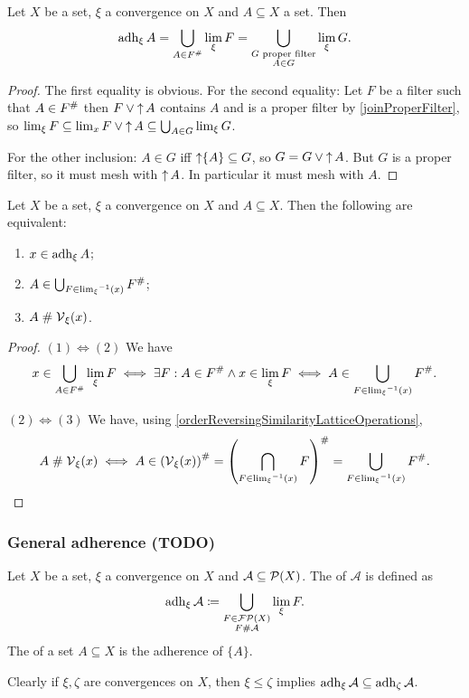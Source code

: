 \begin{lemma}
Let $X$ be a set, $\xi$ a convergence on $X$ and $A \subseteq X$ a set. Then
\[ \operatorname{adh}_\xi A = \bigcup_{A \in F^{\mathrel{\#}}}\lim_\xi F = \bigcup_{\substack{\text{$G$ proper filter} \\ A\in G}}\lim_\xi G. \]
\end{lemma}
\begin{proof}
The first equality is obvious. For the second equality: Let $F$ be a filter such that $A\in F^{\mathrel{\#}}$ then $F \vee \operatorname{\uparrow} A$ contains $A$ and is a proper filter by \ref{joinProperFilter}, so $\lim_\xi F \subseteq \lim_x F \vee \operatorname{\uparrow} A \subseteq \bigcup_{A\in G}\lim_\xi G$.

For the other inclusion: $A\in G$ iff $\operatorname{\uparrow}\{A\} \subseteq G$, so $G = G \vee \operatorname{\uparrow} A$. But $G$ is a proper filter, so it must mesh with $\operatorname{\uparrow} A$. In particular it must mesh with $A$.
\end{proof}



\begin{proposition}
Let $X$ be a set, $\xi$ a convergence on $X$ and $A \subseteq X$. Then the following are equivalent:
\begin{enumerate}
\item $x\in \operatorname{adh}_\xi A$;
\item $A\in \bigcup_{F\in {\lim_\xi}^{-1}(x)} F^{\mathrel{\#}}$;
\item $A \mathrel{\#} \operatorname{\mathcal{V}}_\xi(x)$.
\end{enumerate}
\end{proposition}
\begin{proof}
$(1) \Leftrightarrow (2)$ We have
\[ x\in \bigcup_{A\in F^{\mathrel{\#}}}\lim_\xi F \iff \exists F: A \in F^{\mathrel{\#}} \land x\in \lim_\xi F \iff A\in  \bigcup_{F\in {\lim_\xi}^{-1}(x)} F^{\mathrel{\#}}. \]

$(2) \Leftrightarrow (3)$ We have, using \ref{orderReversingSimilarityLatticeOperations},
\[ A \mathrel{\#} \operatorname{\mathcal{V}}_\xi(x) \iff A\in \left(\operatorname{\mathcal{V}}_\xi(x)\right)^{\mathrel{\#}} = \left(\bigcap_{F\in {\lim_\xi}^{-1}(x)}F\right)^{\mathrel{\#}} = \bigcup_{F\in {\lim_\xi}^{-1}(x)} F^{\mathrel{\#}}. \]
\end{proof}

\subsubsection{General adherence (TODO)}
\begin{definition}
Let $X$ be a set, $\xi$ a convergence on $X$ and $\mathcal{A} \subseteq \operatorname{\mathcal{P}}(X)$. The  of $\mathcal{A}$ is defined as
\[ \operatorname{adh}_\xi\mathcal{A} \coloneqq \bigcup_{\substack{F \in \operatorname{\mathcal{FP}}(X) \\ F \mathrel{\#} \mathcal{A}}} \lim_\xi F. \]
The  of a set $A\subseteq X$ is the adherence of $\{A\}$.
\end{definition}
Clearly if $\xi,\zeta$ are convergences on $X$, then $\xi \leq \zeta$ implies $\operatorname{adh}_\xi\mathcal{A} \subseteq \operatorname{adh}_\zeta\mathcal{A}$.

